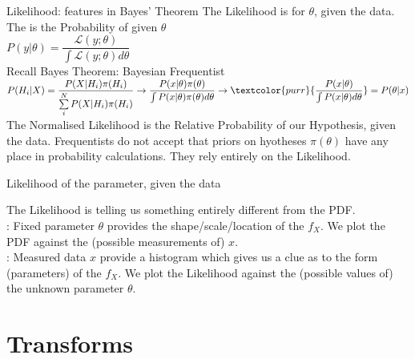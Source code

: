 \documentclass[10pt,sans,english,compress,table,xcolor=dvipsnames]{beamer}
\begin{document}
\begin{frame}{Likelihood: features in Bayes' Theorem}
\small
The Likelihood is for $\theta$, given the data.\\[1ex]
The  is the Probability of  given $\theta$\\[1ex]
$P(y | \theta) = \dfrac{\mathcal{L}(y;\theta)}{\int \mathcal{L}(y;\theta) d\theta}$\\[2ex]

Recall Bayes Theorem: \hspace{1cm} Bayesian  \hspace{2cm}  \textcolor{purr}{Frequentist}\\[1ex]
$P(H_i | X) = \dfrac{ P(X|H_i) \pi(H_i) } {  \sum\limits_i^N P(X | H_i) \pi(H_i) } \rightarrow \dfrac{ P(x|\theta) \pi(\theta) } {  \int P(x | \theta) \pi(\theta) d\theta }  \rightarrow \textcolor{purr}{\dfrac{ P(x|\theta)  } {  \int P(x | \theta)  d\theta } } = P(\theta|x)$\\[2ex]

The Normalised Likelihood is the Relative Probability of our Hypothesis, given the data. \textcolor{purr}{Frequentists do not accept that priors on hyotheses $\pi(\theta)$ have any place in probability calculations. They rely entirely on the Likelihood.}
\end{frame}


\begin{frame}{Likelihood of the parameter, given the data}

The Likelihood is telling us something entirely different from the PDF.\\[1ex]

: Fixed parameter $\theta$ provides the shape/scale/location of the $f_X$. We plot the PDF against the (possible measurements of) $x$.\\[1ex]


: Measured data $x$ provide a histogram which gives us a clue as to the form (parameters) of the $f_X$. We plot the Likelihood against the (possible values of) the unknown parameter $\theta$.\\[1ex]

\end{frame}


\section*{Transforms}
\end{document}
